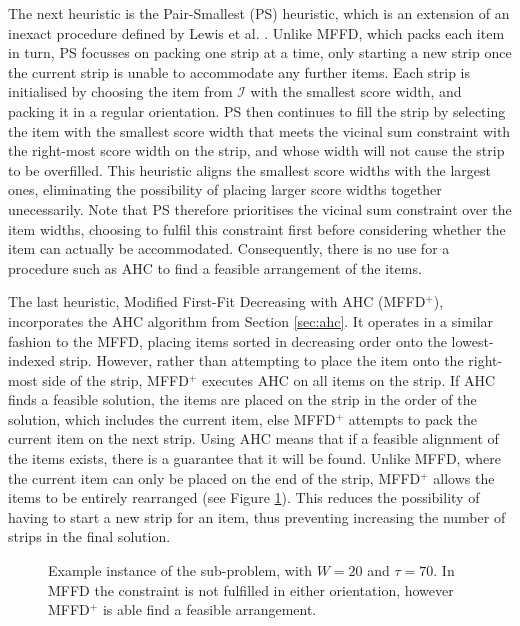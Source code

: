 \documentclass[runningheads]{llncs}
\begin{document}
The next heuristic is the Pair-Smallest (PS) heuristic, which is an extension of an inexact procedure defined by Lewis et al. \cite{lewis2011}. Unlike MFFD, which packs each item in turn, PS focusses on packing one strip at a time, only starting a new strip once the current strip is unable to accommodate any further items. Each strip is initialised by choosing the item from $\mathcal{I}$ with the smallest score width, and packing it in a regular orientation. PS then continues to fill the strip by selecting the item with the smallest score width that meets the vicinal sum constraint with the right-most score width on the strip, and whose width will not cause the strip to be overfilled. This heuristic aligns the smallest score widths with the largest ones, eliminating the possibility of placing larger score widths together unecessarily. Note that PS therefore prioritises the vicinal sum constraint over the item widths, choosing to fulfil this constraint first before considering whether the item can actually be accommodated. Consequently, there is no use for a procedure such as AHC to find a feasible arrangement of the items.

The last heuristic, Modified First-Fit Decreasing with AHC (MFFD$^+$), incorporates the AHC algorithm from Section \ref{sec:ahc}. It operates in a similar fashion to the MFFD, placing items sorted in decreasing order onto the lowest-indexed strip. However, rather than attempting to place the item onto the right-most side of the strip, MFFD$^+$ executes AHC on all items on the strip. If AHC finds a feasible solution, the items are placed on the strip in the order of the solution, which includes the current item, else MFFD$^+$ attempts to pack the current item on the next strip. Using AHC means that if a feasible alignment of the items exists, there is a guarantee that it will be found. Unlike MFFD, where the current item can only be placed on the end of the strip, MFFD$^+$ allows the items to be entirely rearranged (see Figure \ref{fig:comparestrips}). This reduces the possibility of having to start a new strip for an item, thus preventing increasing the number of strips in the final solution. 

\begin{figure}[H]	
	\centering
	
	\caption{Example instance of the sub-problem, with $W = 20$ and $\tau = 70$. In MFFD the constraint is not fulfilled in either orientation, however MFFD$^+$ is able find a feasible arrangement.}	
	\label{fig:comparestrips}
\end{figure}
\end{document}
